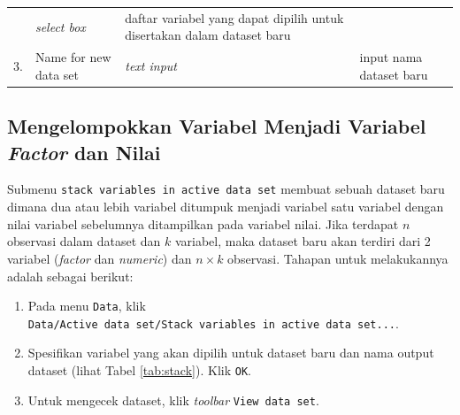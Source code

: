 \documentclass[12pt,]{krantz}
\providecommand{\tightlist}{%
  \setlength{\itemsep}{0pt}\setlength{\parskip}{0pt}}
\begin{document}
\begin{longtable}[]{@{}llll@{}}
\begin{minipage}[t]{0.14\columnwidth}
\end{minipage} & \begin{minipage}[t]{0.09\columnwidth}\raggedright
\emph{select box}\strut
\end{minipage} & \begin{minipage}[t]{0.61\columnwidth}\raggedright
daftar variabel yang dapat dipilih untuk disertakan dalam dataset baru\strut
\end{minipage}\tabularnewline
\begin{minipage}[t]{0.04\columnwidth}\raggedright
3.\strut
\end{minipage} & \begin{minipage}[t]{0.14\columnwidth}\raggedright
Name for new data set\strut
\end{minipage} & \begin{minipage}[t]{0.09\columnwidth}\raggedright
\emph{text input}\strut
\end{minipage} & \begin{minipage}[t]{0.61\columnwidth}\raggedright
input nama dataset baru\strut
\end{minipage}\tabularnewline
\bottomrule
\end{longtable}

\hypertarget{mengelompokkan-variabel-menjadi-variabel-factor-dan-nilai}{%
\subsection{\texorpdfstring{Mengelompokkan Variabel Menjadi Variabel \emph{Factor} dan Nilai}{Mengelompokkan Variabel Menjadi Variabel Factor dan Nilai}}\label{mengelompokkan-variabel-menjadi-variabel-factor-dan-nilai}}

Submenu \texttt{stack\ variables\ in\ active\ data\ set} membuat sebuah dataset baru dimana dua atau lebih variabel ditumpuk menjadi variabel satu variabel dengan nilai variabel sebelumnya ditampilkan pada variabel nilai. Jika terdapat \(n\) observasi dalam dataset dan \(k\) variabel, maka dataset baru akan terdiri dari 2 variabel (\emph{factor} dan \emph{numeric}) dan \(n\times k\) observasi. Tahapan untuk melakukannya adalah sebagai berikut:

\begin{enumerate}
\def\labelenumi{\arabic{enumi}.}
\tightlist
\item
  Pada menu \texttt{Data}, klik \texttt{Data/Active\ data\ set/Stack\ variables\ in\ active\ data\ set...}.
\item
  Spesifikan variabel yang akan dipilih untuk dataset baru dan nama output dataset (lihat Tabel \ref{tab:stack}). Klik \texttt{OK}.
\item
  Untuk mengecek dataset, klik \emph{toolbar} \texttt{View\ data\ set}.
\end{enumerate}
\end{document}
